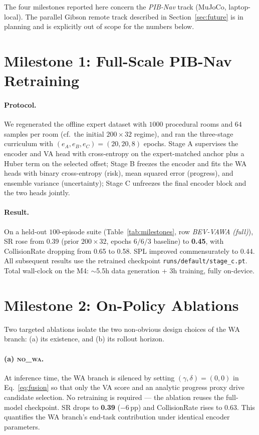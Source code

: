 \documentclass[11pt,a4paper]{article}
\begin{document}
The four milestones reported here concern the \emph{PIB-Nav} track
(MuJoCo, laptop-local). The parallel Gibson \citep{Gibson2018} remote
track described in Section~\ref{sec:future} is in planning and is
explicitly out of scope for the numbers below.

\section{Milestone 1: Full-Scale PIB-Nav Retraining}\label{sec:retrain}

\paragraph{Protocol.} We regenerated the offline expert dataset with
$1000$ procedural rooms and $64$ samples per room
(cf.\ the initial $200{\times}32$ regime), and ran the three-stage
curriculum with $(e_A,e_B,e_C)=(20,20,8)$ epochs. Stage A supervises
the encoder and VA head with cross-entropy on the expert-matched anchor
plus a Huber term on the selected offset; Stage B freezes the encoder
and fits the WA heads with binary cross-entropy (risk), mean squared
error (progress), and ensemble variance (uncertainty); Stage C
unfreezes the final encoder block and the two heads jointly.

\paragraph{Result.} On a held-out $100$-episode suite
(Table~\ref{tab:milestones}, row \emph{BEV-VAWA (full)}),
SR rose from 0.39 (prior $200{\times}32$, epochs $6/6/3$ baseline) to
\textbf{0.45}, with CollisionRate dropping from 0.65 to 0.58. SPL
improved commensurately to 0.44. All subsequent results use the retrained
checkpoint \texttt{runs/default/stage\_c.pt}. Total wall-clock on the
M4: ${\sim}$5.5h data generation + 3h training, fully on-device.

\section{Milestone 2: On-Policy Ablations}\label{sec:ablation}

Two targeted ablations isolate the two non-obvious design choices of
the WA branch: (a) its existence, and (b) its rollout horizon.

\paragraph{(a) \textsc{no\_wa}.} At inference time, the WA branch is
silenced by setting $(\gamma,\delta)=(0,0)$ in Eq.~\ref{eq:fusion} so
that only the VA score and an analytic progress proxy drive candidate
selection. No retraining is required --- the ablation reuses the
full-model checkpoint. SR drops to \textbf{0.39} ($-6$\,pp) and
CollisionRate rises to 0.63. This quantifies the WA branch's end-task
contribution under identical encoder parameters.
\end{document}
